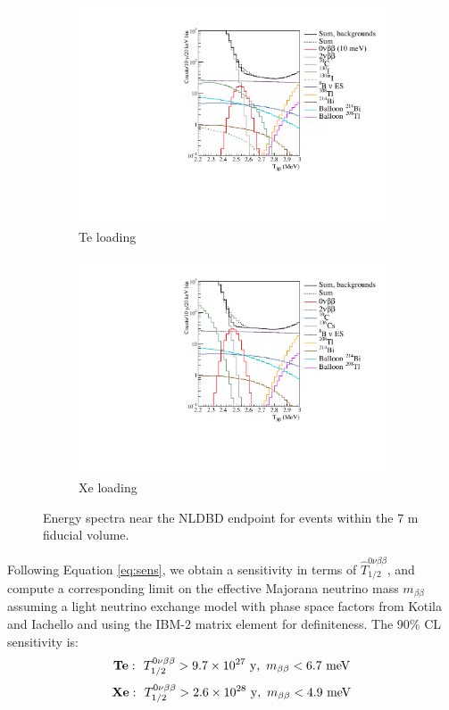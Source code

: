 \begin{figure}
\centering
\begin{subfigure}[b]{0.49\textwidth}
 \includegraphics[width=\textwidth]{dbd/spectrum_plot_te_3p.pdf}
 \caption{Te loading}
 \label{fig:spectrum-te}
\end{subfigure}
\begin{subfigure}[b]{0.49\textwidth}
 \includegraphics[width=\textwidth]{dbd/spectrum_plot_xe_3p.pdf}
 \caption{Xe loading}
 \label{fig:spectrum-xe}
\end{subfigure}
\caption{Energy spectra near the NLDBD endpoint for events within the 7 m
fiducial volume.}
\label{fig:spectrum-plots}
\end{figure}

Following Equation \ref{eq:sens}, we obtain a sensitivity in terms of
$\hat{T}_{1/2}^{0\nu\beta\beta}$, and compute a corresponding limit on
the effective Majorana neutrino mass $m_{\beta\beta}$ assuming a light
neutrino exchange model with phase space factors from
Kotila and Iachello \cite{2012PhRvC..85c4316K} and using the IBM-2 matrix
element \cite{Barea:2013wb} for definiteness. The 90\% CL sensitivity
is:
\[
\mathrm{\bf Te:}~~
  T_{1/2}^{0\nu\beta\beta} > 9.7\times10^{27}~\mathrm{y},~
  m_{\beta\beta} < 6.7~\mathrm{meV}
\]
\[
\mathrm{\bf Xe:}~~
  T_{1/2}^{0\nu\beta\beta} > 2.6\times10^{28}~\mathrm{y},~
  m_{\beta\beta} < 4.9~\mathrm{meV}
\]

